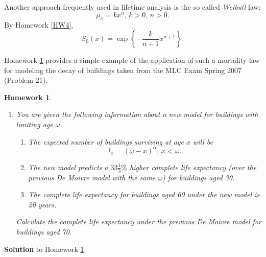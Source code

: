 \documentclass[11pt,fleqn,oneside]{book}
\newtheorem{homework}{Homework}
\begin{document}
Another approach frequently used in lifetime analysis is the so called \textit{Weibull} law:
$$
\mu_x = kx^n,\,k>0,\,n>0.
$$
By Homework \ref{HW4},  
$$
S_0(x) = \exp\left\{ - \frac{k}{n+1} x^{n+1}\right\}.
$$

Homework \ref{HW9} provides a simple example of the application of such a mortality law for modeling the decay of buildings taken from the MLC Exam Spring 2007 (Problem 21).

\begin{homework}
\label{HW9}
\begin{enumerate}
\item You are given the following information about a new model for buildings with limiting age $\omega$.
\begin{enumerate}
\item The expected number of buildings surviving at age $x$ will be
$$
l_x = \left(\omega - x\right)^{\alpha},\,x<\omega.
$$ 
\item The new model predicts a $33\frac{1}{3}\%$ higher complete life expectancy (over the previous De Moivre model with the same $\omega$) for buildings aged 30.
\item The complete life expectancy for buildings aged 60 under the new model is 20 years.
\end{enumerate}
Calculate the complete life expectancy under the previous De Moivre model for buildings aged 70.
\end{enumerate}
\end{homework}

\textbf{Solution} to Homework \ref{HW9}:
\end{document}

